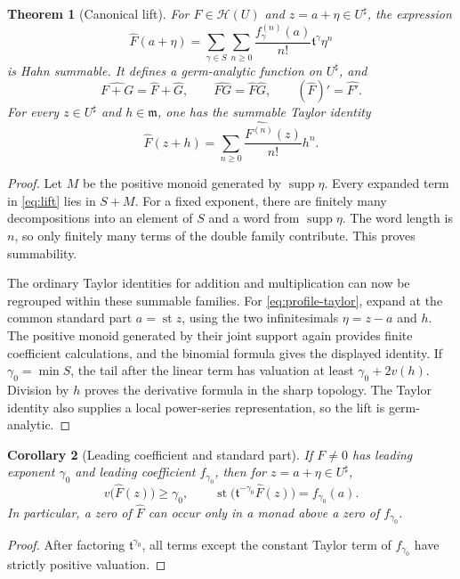\documentclass[11pt,a4paper]{article}
\numberwithin{equation}{section}
\newtheorem{theorem}{Theorem}[section]
\newtheorem{corollary}[theorem]{Corollary}
\theoremstyle{definition}
\newcommand{\tmon}{\mathfrak t}
\newcommand{\mm}{\mathfrak m}
\newcommand{\HH}{\mathscr H}
\newcommand{\st}{\operatorname{st}}
\newcommand{\supp}{\operatorname{supp}}
\newcommand{\hhat}[1]{\widehat{#1}}
\begin{document}
\begin{theorem}[Canonical lift]\label{thm:lift}
For $F\in\HH(U)$ and $z=a+\eta\in U^\sharp$, the expression
\begin{equation}\label{eq:lift}
 \hhat F(a+\eta)=
 \sum_{\gamma\in S}\sum_{n\geq0}
 \frac{f_\gamma^{(n)}(a)}{n!}\tmon^\gamma\eta^n
\end{equation}
is Hahn summable. It defines a germ-analytic function on $U^\sharp$, and
\[
 \hhat{F+G}=\hhat F+\hhat G,\qquad
 \hhat{FG}=\hhat F\hhat G,\qquad
 (\hhat F)'=\hhat{F'}.
\]
For every $z\in U^\sharp$ and $h\in\mm$, one has the summable Taylor identity
\begin{equation}\label{eq:profile-taylor}
 \hhat F(z+h)=\sum_{n\geq0}\frac{\hhat{F^{(n)}}(z)}{n!}h^n.
\end{equation}
\end{theorem}
\begin{proof}
Let $M$ be the positive monoid generated by $\supp\eta$.
Every expanded term in \eqref{eq:lift} lies in $S+M$. For a fixed exponent,
there are finitely many decompositions into an element of $S$ and a word
from $\supp\eta$. The word length is $n$, so only finitely many terms of the
double family contribute. This proves summability.

The ordinary Taylor identities for addition and multiplication can now be
regrouped within these summable families. For \eqref{eq:profile-taylor},
expand at the common standard part $a=\st z$, using the two infinitesimals
$\eta=z-a$ and $h$. The positive monoid generated by their joint support again
provides finite coefficient calculations, and the binomial formula gives
the displayed identity. If $\gamma_0=\min S$, the tail after the linear term
has valuation at least $\gamma_0+2v(h)$. Division by $h$ proves the derivative
formula in the sharp topology. The Taylor identity also supplies a local
power-series representation, so the lift is germ-analytic.
\end{proof}

\begin{corollary}[Leading coefficient and standard part]\label{cor:reduction}
If $F\neq0$ has leading exponent $\gamma_0$ and leading coefficient
$f_{\gamma_0}$, then for $z=a+\eta\in U^\sharp$,
\[
 v\bigl(\hhat F(z)\bigr)\geq\gamma_0,
 \qquad
 \st\bigl(\tmon^{-\gamma_0}\hhat F(z)\bigr)=f_{\gamma_0}(a).
\]
In particular, a zero of $\hhat F$ can occur only in a monad above a zero
of $f_{\gamma_0}$.
\end{corollary}
\begin{proof}
After factoring $\tmon^{\gamma_0}$, all terms except the constant Taylor
term of $f_{\gamma_0}$ have strictly positive valuation.
\end{proof}
\end{document}

